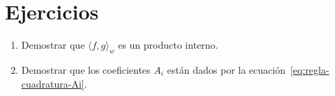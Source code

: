 
\section*{Ejercicios}
\label{sec:ejercicios-06}

  \begin{enumerate}
  \item
    Demostrar que \(\langle f, g \rangle_w\)
    es un producto interno.
  \item
    Demostrar que los coeficientes \(A_i\)
    están dados por la ecuación~\eqref{eq:regla-cuadratura-Ai}.
  \end{enumerate}




